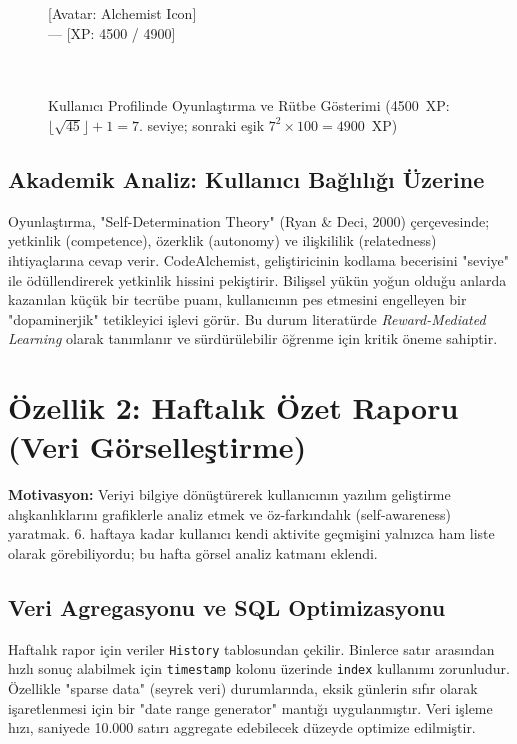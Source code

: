 \documentclass[12pt,a4paper]{article}
\begin{document}
\begin{figure}[H]
  \centering
  \begin{tcolorbox}[colback=white, colframe=noteborder, title=Görsel 1: Kullanıcı Profil Paneli]
    \small
    [Avatar: Alchemist Icon] \\
    [Level: 7] --- [XP: 4500 / 4900] \\
    [Progress Bar: \%92 Doluluk] \\
    [Unvan: Code Adept] \\
    [Badge: Early Adopter, Code Master]
  \end{tcolorbox}
  \caption{Kullanıcı Profilinde Oyunlaştırma ve Rütbe Gösterimi
    (4500~XP: $\lfloor\sqrt{45}\rfloor+1 = 7$. seviye;
     sonraki eşik $7^2 \times 100 = 4900$~XP)}
\end{figure}

\subsection{Akademik Analiz: Kullanıcı Bağlılığı Üzerine}
Oyunlaştırma, "Self-Determination Theory" (Ryan \& Deci, 2000) çerçevesinde; yetkinlik (competence), özerklik (autonomy) ve ilişkililik (relatedness) ihtiyaçlarına cevap verir. CodeAlchemist, geliştiricinin kodlama becerisini "seviye" ile ödüllendirerek yetkinlik hissini pekiştirir. Bilişsel yükün yoğun olduğu anlarda kazanılan küçük bir tecrübe puanı, kullanıcının pes etmesini engelleyen bir "dopaminerjik" tetikleyici işlevi görür. Bu durum literatürde \textit{Reward-Mediated Learning} olarak tanımlanır ve sürdürülebilir öğrenme için kritik öneme sahiptir.

\section{Özellik 2: Haftalık Özet Raporu (Veri Görselleştirme)}

\textbf{Motivasyon:} Veriyi bilgiye dönüştürerek kullanıcının yazılım geliştirme alışkanlıklarını grafiklerle analiz etmek ve öz-farkındalık (self-awareness) yaratmak. 6. haftaya kadar kullanıcı kendi aktivite geçmişini yalnızca ham liste olarak görebiliyordu; bu hafta görsel analiz katmanı eklendi.

\subsection{Veri Agregasyonu ve SQL Optimizasyonu}
Haftalık rapor için veriler \texttt{History} tablosundan çekilir. Binlerce satır arasından hızlı sonuç alabilmek için \texttt{timestamp} kolonu üzerinde \texttt{index} kullanımı zorunludur. Özellikle "sparse data" (seyrek veri) durumlarında, eksik günlerin sıfır olarak işaretlenmesi için bir "date range generator" mantığı uygulanmıştır. Veri işleme hızı, saniyede 10.000 satırı aggregate edebilecek düzeyde optimize edilmiştir.
\end{document}
